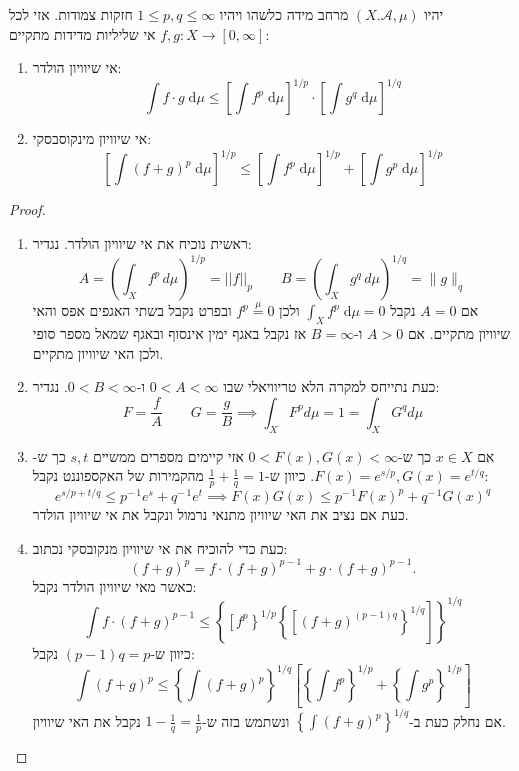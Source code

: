 \documentclass{tstextbook}
\begin{document}
\begin{proposition}
יהיו \(\left( X.\mathcal{A},\mu \right)\) מרחב מידה כלשהו ויהיו \(1\leq p,q\leq \infty\) חזקות צמודות. אזי לכל \(f,g:X\to \left[ 0,\infty \right]\) אי שליליות מדידות מתקיים:

  \begin{enumerate}
    \item אי שיוויון הולדר: 
$$\int f\cdot g \;\mathrm{d} \mu \leq \left[ \int f^{p} \;\mathrm{d} \mu  \right]^{1/p} \cdot\left[ \int g^{q} \;\mathrm{d} \mu  \right]^{1/q} $$


    \item אי שיוויון מינקוסבסקי: 
$$\left[ \int (f+g)^{p} \;\mathrm{d} \mu \right]^{1/p} \leq \left[ \int f^{p} \;\mathrm{d} \mu  \right]^{1/p}+\left[ \int g^{p} \;\mathrm{d} \mu  \right]^{1/p}$$


  \end{enumerate}
\end{proposition}
\begin{proof}
  \begin{enumerate}
    \item ראשית נוכיח את אי שיוויון הולדר. נגדיר: 
$$A=\left(\int_{X}f^{p}\,d\mu\right)^{1/p}=||f||_{p}\qquad B=\left(\int_{X}g^{q}\,d\mu\right)^{1/q}=\|g\|_{q}$$
אם \(A=0\) נקבל \(\int_X f^p \; \mathrm{d}\mu = 0\) ולכן \(f^{p}\overset{\mu}{=}0\) ובפרט נקבל בשתי האגפים אפס והאי שיוויון מתקיים.
אם \(A> 0\) ו-\(B=\infty\) אז נקבל באגף ימין אינסוף ובאגף שמאל מספר סופי ולכן האי שיוויון מתקיים.


    \item כעת נתייחס למקרה הלא טריוויאלי שבו \(0<A<\infty\) ו-\(0<B< \infty\). נגדיר: 
$$ F=\frac{f}{A} \qquad G=\frac{g}{B} \implies \int_{X}F^{p}d\mu=1=\int_{X}G^{q}d\mu$$


    \item אם \(x \in X\) כך ש-\(0<F(x),G(x)<\infty\) אזי קיימים מספרים ממשיים \(s,t\) כך ש-\(F(x)=e^{ s/p },G(x)=e^{ t/q }\). כיוון ש-\(\frac{1}{p}+\frac{1}{q}=1\) מהקמירות של האקספוננט נקבל: 
$$e^{s/p+t/q}\leq p^{-\,1}e^{s}+q^{-\,1}e^{t}\implies F(x)G(x)\leq p^{-\,1}F(x)^{p}+q^{-\,1}G(x)^{q}$$
כעת אם נציב את האי שיוויון מתנאי נרמול ונקבל את אי שיוויון הולדר.


    \item כעת כדי להוכיח את אי שיוויון מנקובסקי נכתוב: 
$$(f+g)^{p}=f\cdot(f+g)^{p-1}+g\cdot(f+g)^{p-1}.$$
כאשר מאי שיוויון הולדר נקבל:
$$\int f\cdot(f+g)^{p-1}\leq\left\{\left[f^{p}\right\}^{1/p}\left\{\left[(f+g)^{(p-1)q}\right\}^{1/q}\right]\right\}^{1/q}$$
כיוון ש-\((p-1)q=p\) נקבל:
$$\int(f+g)^{p}\leq\left\{\int(f+g)^{p}\right\}^{1/q}\left[\left\{\int f^{p}\right\}^{1/p}+\left\{\int g^{p}\right\}^{1/p}\right]$$
אם נחלק כעת ב-\(\left\{\int(f+g)^{p}\right\}^{1/q}\) ונשתמש בזה ש-\(1-\frac{1}{q}=\frac{1}{p}\) נקבל את האי שיוויון.


  \end{enumerate}
\end{proof}
\end{document}
